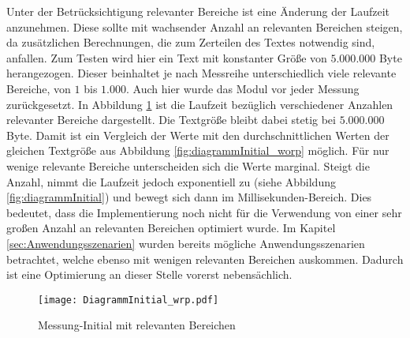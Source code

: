 Unter der Betrücksichtigung relevanter Bereiche ist eine Änderung der Laufzeit
anzunehmen. Diese sollte mit wachsender Anzahl an relevanten Bereichen steigen,
da zusätzlichen Berechnungen, die zum Zerteilen des Textes notwendig sind,
anfallen.
\newline
Zum Testen wird hier ein Text mit konstanter Größe von $5.000.000$ Byte
herangezogen. Dieser beinhaltet je nach Messreihe unterschiedlich viele
relevante Bereiche, von $1$ bis $1.000$. Auch hier wurde das Modul vor jeder
Messung zurückgesetzt.
\newline
In Abbildung \ref{fig:diagrammInitial_wrp} ist die Laufzeit bezüglich
verschiedener Anzahlen relevanter Bereiche dargestellt. Die Textgröße bleibt
dabei stetig bei $5.000.000$ Byte. Damit ist ein Vergleich der Werte mit den
durchschnittlichen Werten der gleichen Textgröße aus Abbildung
\ref{fig:diagrammInitial_worp} möglich. Für nur wenige relevante Bereiche
unterscheiden sich die Werte marginal. Steigt die Anzahl, nimmt die Laufzeit
jedoch exponentiell zu (siehe Abbildung \ref{fig:diagrammInitial}) und bewegt
sich dann im Millisekunden-Bereich. Dies bedeutet, dass die Implementierung noch
nicht für die Verwendung von einer sehr großen Anzahl an relevanten Bereichen
optimiert wurde. Im Kapitel \ref{sec:Anwendungsszenarien} wurden bereits
mögliche Anwendungsszenarien betrachtet, welche ebenso mit wenigen relevanten
Bereichen auskommen. Dadurch ist eine Optimierung an dieser Stelle vorerst
nebensächlich.

\begin{figure}[H]
	\centering
	\texttt{[image: DiagrammInitial\_wrp.pdf]}
	\label{fig:diagrammInitial_wrp}
	\caption{Messung-Initial mit relevanten Bereichen}
\end{figure}

